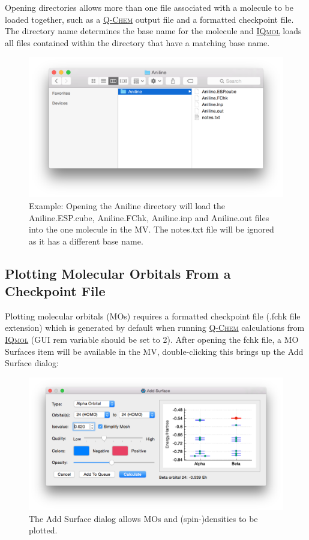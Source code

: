 \documentclass[a4paper,12pt]{article}
\newcommand{\qchem}{\href{http://q-chem.com}{{\scshape Q-Chem}}}
\newcommand{\iqmol}{\href{http://iqmol.org}{{\scshape IQmol}}}
\begin{document}
Opening directories allows more than one file associated with a molecule to be
loaded together, such as a \qchem{} output file and a formatted checkpoint
file.  The directory name determines the base name for the molecule and
\iqmol{} loads all files contained within the directory that have a matching
base name.  
\begin{figure}[h]
\begin{center}
\includegraphics[scale=0.40]{figures/OpenDir.png}
\caption{Example: Opening the Aniline directory will load the Aniline.ESP.cube,
Aniline.FChk, Aniline.inp and Aniline.out files into the one molecule in the
MV.  The notes.txt file will be ignored as it has a different base name.} 
\end{center}
\end{figure}


\subsection{Plotting Molecular Orbitals From a Checkpoint File}
\label{sec:mos}
Plotting molecular orbitals (MOs) requires a formatted checkpoint file (.fchk
file extension) which is generated by default when running \qchem{}
calculations from \iqmol{} (GUI rem variable should be set to 2).  After
opening the fchk file, a MO Surfaces item will be available in the MV,
double-clicking this brings up the Add Surface dialog:
\begin{figure}[h]
\begin{center}
\includegraphics[scale=0.25]{figures/MolecularOrbitalsConfigurator.png}
\caption{The Add Surface dialog allows MOs and (spin-)densities to be plotted.
} 
\label{fig:addsurface}
\end{center}
\end{figure}
\end{document}
